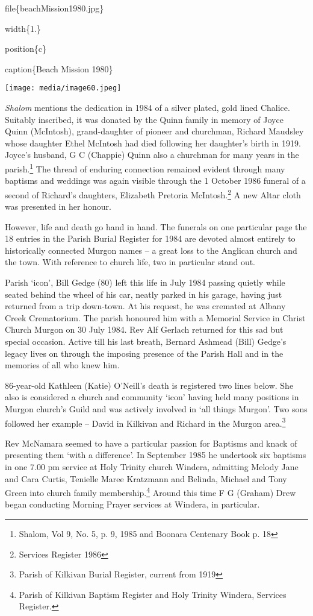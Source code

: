 file\{beachMission1980.jpg\}

width\{1.\}

position\{c\}

caption\{Beach Mission 1980\}

\texttt{[image: media/image60.jpeg]}

\emph{Shalom} mentions the dedication in 1984 of a silver plated, gold lined Chalice. Suitably inscribed, it was donated by the Quinn family in memory of Joyce Quinn (McIntosh), grand-daughter of pioneer and churchman, Richard Maudsley whose daughter Ethel McIntosh had died following her daughter's birth in 1919. Joyce's husband, G C (Chappie) Quinn also a churchman for many years in the parish.\footnote{Shalom, Vol 9, No. 5, p. 9, 1985 and Boonara Centenary Book p. 18} The thread of enduring connection remained evident through many baptisms and weddings was again visible through the 1 October 1986 funeral of a second of Richard's daughters, Elizabeth Pretoria McIntosh.\footnote{Services Register 1986} A new Altar cloth was presented in her honour.

However, life and death go hand in hand. The funerals on one particular page the 18 entries in the Parish Burial Register for 1984 are devoted almost entirely to historically connected Murgon names -- a great loss to the Anglican church and the town. With reference to church life, two in particular stand out.

Parish `icon', Bill Gedge (80) left this life in July 1984 passing quietly while seated behind the wheel of his car, neatly parked in his garage, having just returned from a trip down-town. At his request, he was cremated at Albany Creek Crematorium. The parish honoured him with a Memorial Service in Christ Church Murgon on 30 July 1984. Rev Alf Gerlach returned for this sad but special occasion. Active till his last breath, Bernard Ashmead (Bill) Gedge's legacy lives on through the imposing presence of the Parish Hall and in the memories of all who knew him.

86-year-old Kathleen (Katie) O'Neill's death is registered two lines below. She also is considered a church and community `icon' having held many positions in Murgon church's Guild and was actively involved in `all things Murgon'. Two sons followed her example -- David in Kilkivan and Richard in the Murgon area.\footnote{Parish of Kilkivan Burial Register, current from 1919}

Rev McNamara seemed to have a particular passion for Baptisms and knack of presenting them `with a difference'. In September 1985 he undertook six baptisms in one 7.00 pm service at Holy Trinity church Windera, admitting Melody Jane and Cara Curtis, Tenielle Maree Kratzmann and Belinda, Michael and Tony Green into church family membership.\footnote{Parish of Kilkivan Baptism Register and Holy Trinity Windera, Services Register.} Around this time F G (Graham) Drew began conducting Morning Prayer services at Windera, in particular.

